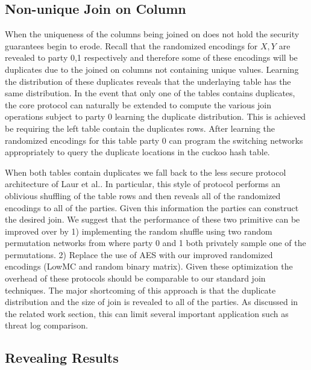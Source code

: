 \subsection{Non-unique Join on Column}


When the uniqueness of the columns being joined on does not hold the security guarantees begin to erode. Recall that the randomized encodings for $X,Y$ are revealed to party 0,1 respectively and therefore some of these encodings will be duplicates due to the joined on columns not containing unique values. Learning the distribution of these duplicates reveals that the underlaying table has the same distribution. In the event that only one of the tables contains duplicates, the core protocol can naturally be extended to compute the various join operations subject to party 0 learning the duplicate distribution. This is achieved be requiring the left table contain the duplicates rows. After learning the randomized encodings for this table party 0 can program the switching networks appropriately to query the duplicate locations in the cuckoo hash table. 

When both tables contain duplicates we fall back to the less secure protocol architecture of Laur et al.\cite{LTW13}. In particular, this style of protocol  performs an oblivious shuffling of the table rows and then reveals all of the randomized encodings to all of the parties. Given this information the parties can construct the desired join. We suggest that the performance of these two primitive can be improved over \cite{LTW13} by 1) implementing the random shuffle using two random permutation networks from  where party 0 and 1 both privately sample one of the permutations. 2) Replace the use of AES with our improved randomized encodings (LowMC and random binary matrix). Given these optimization the overhead of these protocols should be comparable to our standard join techniques. The major shortcoming of this approach is that the duplicate distribution and the size of join is revealed to all of the parties. As discussed in the related work section, this can limit several important application such as threat log comparison. 

\subsection{Revealing Results}

